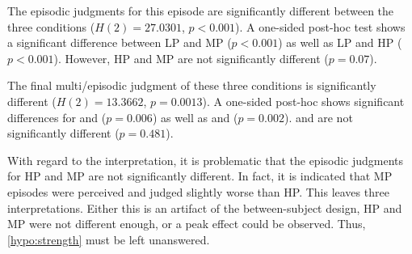 The episodic judgments for this episode are significantly different between the three conditions ($H(2)=27.0301$, $p<0.001$).
A one-sided post-hoc test shows a significant difference between \ac{LP} and \ac{MP} ($p<0.001$) as well as \ac{LP} and \ac{HP} ($p<0.001$). %
However, \ac{HP} and \ac{MP} are not significantly different ($p=0.07$).

The final multi\-/episodic judgment of these three conditions is significantly different ($H(2)=13.3662$, $p=0.0013$).
A one-sided post-hoc shows significant differences for \CIIa{} and \CVb{} ($p=0.006$) as well as \CVb{} and  ($p=0.002$).
\CIIa{} and  are not significantly different ($p=0.481$).

With regard to the interpretation, it is problematic that the episodic judgments for \ac{HP} and \ac{MP} are not significantly different.
In fact, it is indicated that \ac{MP} episodes were perceived and judged slightly worse than \ac{HP}.
This leaves three interpretations.
Either this is an artifact of the between-subject design, \ac{HP} and \ac{MP} were not different enough, or a peak effect could be observed.
Thus, \autoref{hypo:strength} must be left unanswered.

